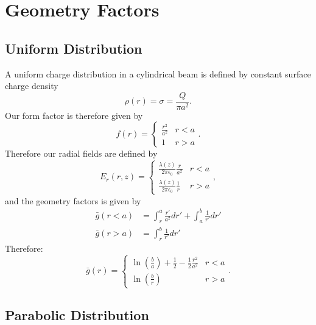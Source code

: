 \section{Geometry Factors}

\subsection{Uniform Distribution}

A uniform charge distribution in a cylindrical beam is defined by constant surface charge density 
$$\rho(r) = \sigma = \frac{Q}{\pi a^2}.$$ 
Our form factor is therefore given by
$$f(r) = \begin{cases}
        \frac{r^2}{a^2} & r < a \\
        1               & r > a
\end{cases}.$$
Therefore our radial fields are defined by
$$E_r(r,z) = \begin{cases}
    \frac{\lambda(z)}{2\pi\epsilon_0}\frac{r}{a^2} & r < a \\
    \frac{\lambda(z)}{2\pi\epsilon_0}\frac{1}{r}   & r > a
\end{cases},$$
and the geometry factors is given by
$$\begin{aligned}\bar{g}(r<a) &= \int_r^a\frac{r'}{a^2}dr'+\int_a^b\frac{1}{r'}dr' \\     \bar{g}(r>a) &= \int_r^b\frac{1}{r'}dr'\end{aligned}$$
Therefore:
\begin{equation}
    \bar{g}(r) = \begin{cases}
        \ln(\frac{b}{a})+\frac{1}{2}-\frac{1}{2}\frac{r^2}{a^2} & r < a \\
        \ln(\frac{b}{r})                                        & r > a
    \end{cases}
    \label{eq:g_uniform}.
\end{equation}

\subsection{Parabolic Distribution}

